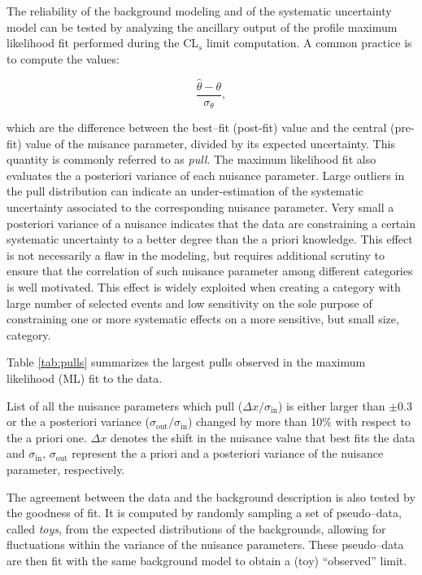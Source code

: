 The reliability of the background modeling and of the systematic uncertainty model can be tested by analyzing the ancillary output of the profile maximum likelihood fit performed during the CL$_s$ limit computation. A common practice is to compute the values:

\begin{equation}
\dfrac{\hat{\theta} - \theta}{\sigma_{\theta}},
\end{equation}

which are the difference between the best--fit (post-fit) value and the central (pre-fit) value of the nuisance parameter, divided by its expected uncertainty. This quantity is commonly referred to as \emph{pull}. The maximum likelihood fit also evaluates the a posteriori variance of each nuisance parameter. Large outliers in the pull distribution can indicate an under-estimation of the systematic uncertainty associated to the corresponding nuisance parameter. Very small a posteriori variance of a nuisance indicates that the data are constraining a certain systematic uncertainty to a better degree than the a priori knowledge. This effect is not necessarily a flaw in the modeling, but requires additional scrutiny to ensure that the correlation of such nuisance parameter among different categories is well motivated. This effect is widely exploited when creating a category with large number of selected events and low sensitivity on the sole purpose of constraining one or more systematic effects on a more sensitive, but small size, category. 

Table \ref{tab:pulls} summarizes the largest pulls observed in the maximum likelihood (ML) fit to the data.

\begin{table}
\caption{List of all the nuisance parameters which pull ($\Delta x/\sigma_{\text{in}}$) is either larger than $\pm0.3$ or the a posteriori variance ($\sigma_{\text{out}}/\sigma_{\text{in}}$) changed by more than 10\% with respect to the a priori one. $\Delta x$ denotes the shift in the nuisance value that best fits the data and $\sigma_{\text{in}}, \,\sigma_{\text{out}}$ represent the a priori and a posteriori variance of the nuisance parameter, respectively.}

\label{tab:pulls}
\end{table}

The agreement between the data and the background description is also tested by the goodness of fit. It is computed by randomly sampling a set of pseudo--data, called \emph{toys}, from the expected distributions of the backgrounds, allowing for fluctuations within the variance of the nuisance parameters. These pseudo--data are then fit with the same background model to obtain a (toy) ``observed'' limit. 

